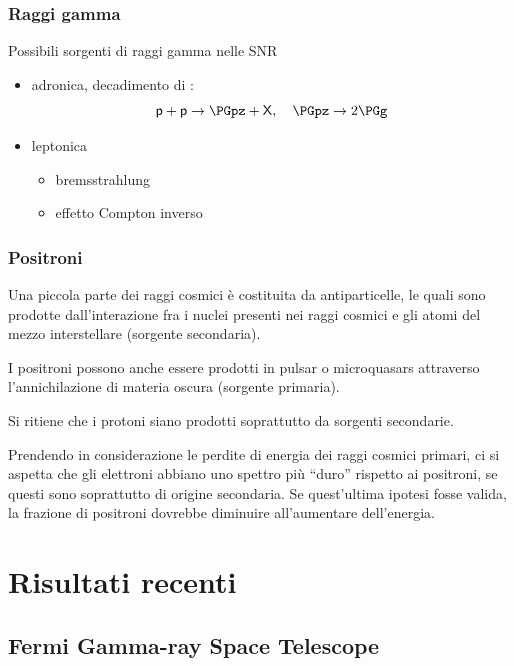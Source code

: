 \documentclass[10pt]{beamer}
\begin{document}
\begin{frame}
  \frametitle{Raggi gamma}
  Possibili sorgenti di raggi gamma nelle SNR
  \begin{itemize}
  \item<+-> adronica, decadimento di \PGpz:
    \begin{equation*}
      \mathsf{p} + \mathsf{p} \to \PGpz + \mathsf{X}, \quad \PGpz \to 2\PGg
    \end{equation*}
  \item<+-> leptonica
    \begin{itemize}
    \item bremsstrahlung
    \item effetto Compton inverso
    \end{itemize}
  \end{itemize}
\end{frame}


\begin{frame}
  \frametitle{Positroni}
  Una piccola parte dei raggi cosmici è costituita da antiparticelle, le quali
  sono prodotte dall'interazione fra i nuclei presenti nei raggi cosmici e gli
  atomi del mezzo interstellare (\alert{sorgente secondaria}).

  I positroni possono anche essere prodotti in pulsar o microquasars attraverso
  l'annichilazione di materia oscura (\alert{sorgente primaria}).

  Si ritiene che i protoni siano
  \alert{prodotti soprattutto da sorgenti secondarie}.

  Prendendo in considerazione le perdite di energia dei raggi cosmici primari,
  ci si aspetta che gli elettroni abbiano uno spettro più ``duro'' rispetto ai
  positroni, se questi sono soprattutto di origine secondaria.  Se quest'ultima
  ipotesi fosse valida,
  \alert{la frazione di positroni dovrebbe diminuire all'aumentare
    dell'energia}.
\end{frame}

\section{Risultati recenti}

\subsection{Fermi Gamma-ray Space Telescope}
\end{document}
